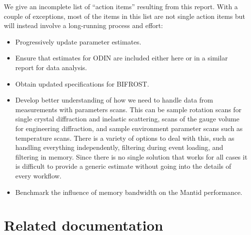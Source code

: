 \documentclass[a4paper,english,numbers=noenddot,bibliography=totoc,chapterprefix=on,DIV=12]{scrartcl}
\newcommand{\bifrost}{BIFROST\xspace}
\newcommand{\odin}{ODIN\xspace}
\newcommand{\mantid}{Mantid\xspace}
\begin{document}
We give an incomplete list of ``action items'' resulting from this report.
With a couple of exceptions, most of the items in this list are not single action items but will instead involve a long-running process and effort:
\begin{itemize}
  \item Progressively update parameter estimates.
  \item Ensure that estimates for \odin are included either here or in a similar report for data analysis.
  \item Obtain updated specifications for \bifrost.
  \item Develop better understanding of how we need to handle data from measurements with parameters scans.
    This can be sample rotation scans for single crystal diffraction and inelastic scattering, scans of the gauge volume for engineering diffraction, and sample environment parameter scans such as temperature scans.
    There is a variety of options to deal with this, such as handling everything independently, filtering during event loading, and filtering in memory.
    Since there is no single solution that works for all cases it is difficult to provide a generic estimate without going into the details of every workflow.
  \item Benchmark the influence of memory bandwidth on the \mantid performance.
\end{itemize}




\appendix




\section{Related documentation}
\label{app:refs}
\end{document}
